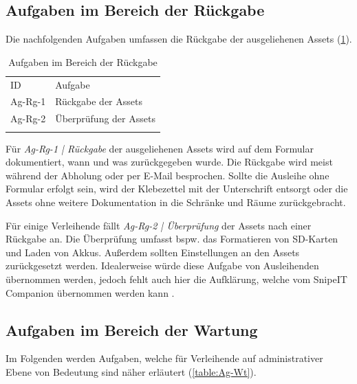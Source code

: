 \subsection{Aufgaben im Bereich der Rückgabe}
Die nachfolgenden Aufgaben umfassen die Rückgabe der ausgeliehenen Assets
(\ref{table:Ag-Rg}).
\begin{table}[h]
        \centering
        \caption{Aufgaben im Bereich der Rückgabe}
        \begin{tabular}{ll}
                \arrayrulecolor{maincolor}\hline
                \sffamily\color{maincolor}ID & \sffamily\color{maincolor}Aufgabe
                \\
                \arrayrulecolor{maincolor}\hline
                Ag-Rg-1                      & Rückgabe der Assets
                \\
                Ag-Rg-2                      & Überprüfung der Assets
                \\
                \arrayrulecolor{maincolor}\hline
        \end{tabular}
        \label{table:Ag-Rg}
\end{table}

Für \textit{Ag-Rg-1 | Rückgabe} der ausgeliehenen Assets wird auf dem Formular
dokumentiert, wann und was zurückgegeben wurde. Die Rückgabe wird meist während
der Abholung oder per E-Mail besprochen. Sollte die Ausleihe ohne Formular
erfolgt sein, wird der Klebezettel mit der Unterschrift entsorgt oder die Assets
ohne weitere Dokumentation in die Schränke und Räume zurückgebracht.

Für einige Verleihende fällt \textit{Ag-Rg-2 | Überprüfung} der Assets nach
einer Rückgabe an. Die Überprüfung umfasst bspw. das Formatieren von SD-Karten
und Laden von Akkus. Außerdem sollten Einstellungen an den Assets zurückgesetzt
werden. Idealerweise würde diese Aufgabe von Ausleihenden übernommen werden,
jedoch fehlt auch hier die Aufklärung, welche vom SnipeIT Companion übernommen
werden kann .
\subsection{Aufgaben im Bereich der Wartung}
\label{subsec:wartung}
Im Folgenden werden Aufgaben, welche für Verleihende auf administrativer Ebene
von Bedeutung sind näher erläutert (\ref{table:Ag-Wt}).

